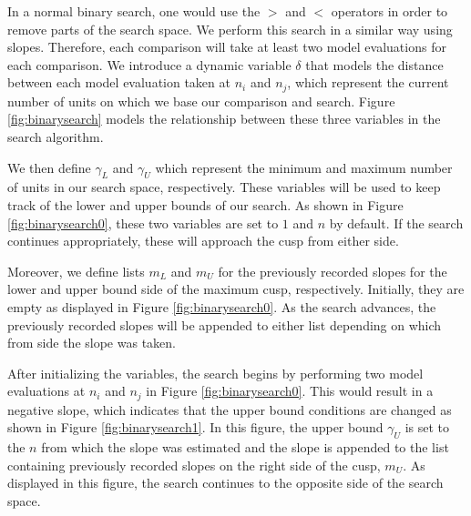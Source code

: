 \documentclass[conference]{IEEEtran}
\begin{document}
In a normal binary search, one would use the $>$ and $<$ operators in order to remove parts of the search space. We perform this search in a similar way using slopes. Therefore, each comparison will take at least two model evaluations for each comparison. We introduce a dynamic variable $\delta$ that models the distance between each model evaluation taken at $n_i$ and $n_j$, which represent the current number of units on which we base our comparison and search. Figure \autoref{fig:binarysearch} models the relationship between these three variables in the search algorithm.

We then define  $\gamma_L$ and $\gamma_U$ which represent the minimum and maximum number of units in our search space, respectively. These variables will be used to keep track of the lower and upper bounds of our search. As shown in Figure \autoref{fig:binarysearch0}, these two variables are set to $1$ and $n$ by default. If the search continues appropriately, these will approach the cusp from either side.

Moreover, we define lists $m_L$ and $m_U$ for the previously recorded slopes for the lower and upper bound side of the maximum cusp, respectively. Initially, they are empty as displayed in Figure \autoref{fig:binarysearch0}. As the search advances, the previously recorded slopes will be appended to either list depending on which from side the slope was taken.

After initializing the variables, the search begins by performing two model evaluations at $n_i$ and $n_j$ in Figure \autoref{fig:binarysearch0}. This would result in a negative slope, which indicates that the upper bound conditions are changed as shown in Figure \autoref{fig:binarysearch1}. In this figure, the upper bound $\gamma_U$ is set to the $n$ from which the slope was estimated and the slope is appended to the list containing previously recorded slopes on the right side of the cusp, $m_U$. As displayed in this figure, the search continues to the opposite side of the search space.
\end{document}
